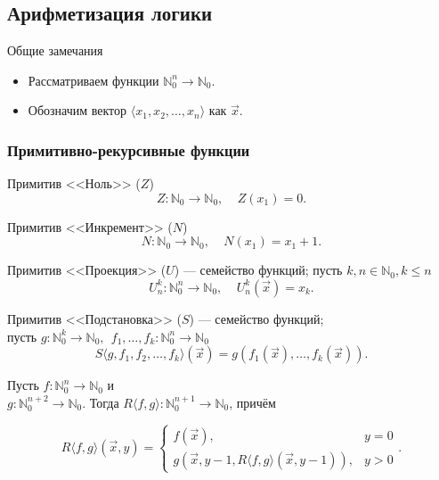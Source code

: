 \subsection{Арифметизация логики}


Общие замечания
\begin{itemize}
\item Рассматриваем функции $\mathbb{N}^n_0\to\mathbb{N}_0$.
\item Обозначим вектор $\langle x_1, x_2, \dots, x_n\rangle$ как $\overrightarrow{x}$.
\end{itemize}


\subsubsection{Примитивно-рекурсивные функции}
\begin{definition}
Примитив <<Ноль>> ($Z$)
\[ Z: \mathbb{N}_0\to\mathbb{N}_0,\ \ \ \ \ Z(x_1) = 0.\]
\end{definition}
\begin{definition}
Примитив <<Инкремент>> ($N$)
\[ N: \mathbb{N}_0\to\mathbb{N}_0,\ \ \ \ \ N(x_1) = x_1+1.\]
\end{definition}
\begin{definition}
Примитив <<Проекция>> ($U$) — семейство функций; пусть $k,n \in \mathbb{N}_0, k \le n$\vspace{-0.3cm}
\[ U^k_n: \mathbb{N}^n_0 \to \mathbb{N}_0,\ \ \ \ \ U^k_n(\overrightarrow{x}) = x_k.\]
\end{definition}
\begin{definition}
Примитив <<Подстановка>> ($S$) --- семейство функций;\\ пусть $g: \mathbb{N}^k_0 \to \mathbb{N}_0,\ \ f_1,\dots,f_k: \mathbb{N}^n_0 \to \mathbb{N}_0$
\[ S\langle g,f_1,f_2,\dots,f_k \rangle (\overrightarrow{x}) = g(f_1(\overrightarrow{x}),\dots,f_k(\overrightarrow{x})).\]
\end{definition}

\begin{definition}
Пусть $f: \mathbb{N}^n_0\to\mathbb{N}_0$ и \\$g: \mathbb{N}^{n+2}_0 \to\mathbb{N}_0$.
Тогда $R\langle f,g\rangle: \mathbb{N}^{n+1}_0\to\mathbb{N}_0$, причём

\[ R\langle f,g\rangle(\overrightarrow{x},y)=
 \left\{\begin{array}{ll}
  f(\overrightarrow{x}), &y=0\\
  g(\overrightarrow{x},y-1,R\langle f,g\rangle (\overrightarrow{x},y-1)), &y > 0
\end{array}\right..\]
\end{definition}

